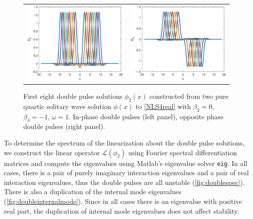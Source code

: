 \documentclass[12pt]{article}
\def\calL{{\mathcal L}}
\begin{document}
\begin{figure}[H]
\centering
\begin{tabular}{cc}
\includegraphics[width=8cm]{images/DPplus.eps} &
\includegraphics[width=8cm]{images/DPminus.eps}
\end{tabular}
\caption{First eight double pulse solutions $\phi_2(x)$ constructed from two pure quartic solitary wave solution $\phi(x)$ to \cref{NLS4real} with $\beta_2 = 0$, $\beta_4 = -1$, $\omega = 1$. In-phase double pulses (left panel), opposite phase double pulses (right panel). }
\label{fig:doublepulses}
\end{figure} 

To determine the spectrum of the linearization about the double pulse solutions, we construct the linear operator $\calL(\phi_2)$ using Fourier spectral differentiation matrices and compute the eigenvalues using Matlab's eigenvalue solver \texttt{eig}. In all cases, there is a pair of purely imaginary interaction eigenvalues and a pair of real interaction eigenvalues, thus the double pulses are all unstable (\cref{fig:doublespec}). There is also a duplication of the internal mode eigenvalues (\cref{fig:doubleinternalmode}). Since in all cases there is an eigenvalue with positive real part, the duplication of internal mode eigenvalues does not affect stability. 
\end{document}
